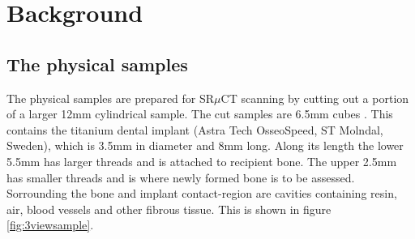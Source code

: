 
\section{Background}

%
%
%
%
%

\subsection{The physical samples}

The physical samples are prepared for SR$\mu$CT scanning by cutting out a portion of a larger
12mm cylindrical sample.  The cut samples are 6.5mm cubes . This contains the titanium dental implant (Astra Tech OsseoSpeed, ST Molndal, Sweden), which is 3.5mm in diameter and 8mm long. Along its length the lower 5.5mm has larger threads and is attached to recipient bone. The upper 2.5mm has smaller threads and is where newly formed bone is to be assessed. Sorrounding the bone and implant contact-region are cavities containing resin, air, blood vessels and other fibrous tissue. This is shown in figure \ref{fig:3viewsample}.

